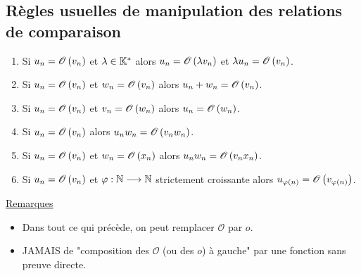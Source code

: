 \subsection{Règles usuelles de manipulation des relations de comparaison}
\begin{defprop}
    \begin{enumerate}
        \item Si \(u_n = \mathscr{O}\left(v_n\right)\) et \(\lambda  \in  \mathbb{K}^*\) alors \(u_n = \mathscr{O}\left(\lambda v_n\right)\) et \(\lambda u_n = \mathscr{O}\left(v_n\right)\).
        \item Si \(u_n = \mathscr{O}\left(v_n\right)\) et \(w_n = \mathscr{O}\left(v_n\right)\) alors \(u_n + w_n = \mathscr{O}\left(v_n\right)\).
        \item Si \(u_n = \mathscr{O}\left(v_n\right)\) et \(v_n = \mathscr{O}\left(w_n\right)\) alors \(u_n = \mathscr{O}\left(w_n\right)\).
        \item Si \(u_n = \mathscr{O}\left(v_n\right)\) alors \(u_nw_n = \mathscr{O}\left(v_nw_n\right)\).
        \item Si \(u_n = \mathscr{O}\left(v_n\right)\) et \(w_n = \mathscr{O}\left(x_n\right)\) alors \(u_nw_n = \mathscr{O}\left(v_nx_n\right)\).
        \item Si \(u_n = \mathscr{O}\left(v_n\right)\) et \(\varphi : \mathbb{N} \longrightarrow \mathbb{N}\) strictement croissante alors \(u_{\varphi(n)} = \mathscr{O}\left(v_{\varphi(n)}\right)\).
    \end{enumerate}
    \underline{Remarques} \\
    \begin{itemize}
        \item Dans tout ce qui précède, on peut remplacer \(\mathscr{O}\) par \(o\).
        \item JAMAIS de "composition des \(\mathscr{O}\) (ou des \(o\)) à gauche" par une fonction sans preuve directe.
    \end{itemize}
\end{defprop}

